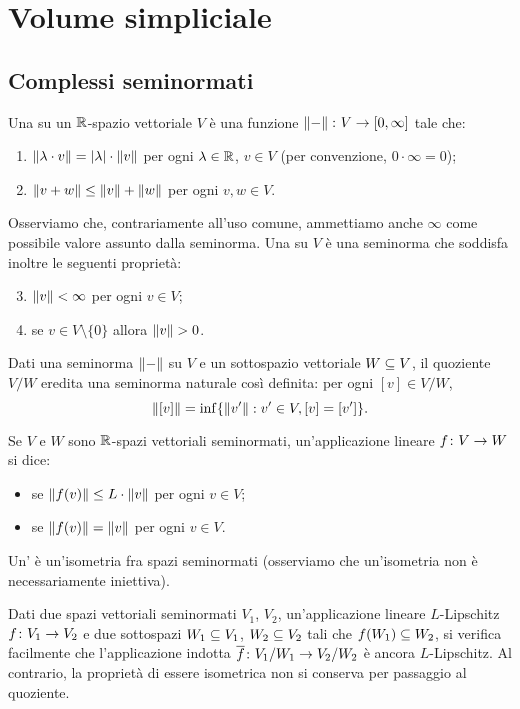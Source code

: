 \section{Volume simpliciale}

\subsection{Complessi seminormati}

\begin{definition}
Una  su un $\mathbb{R}$-spazio vettoriale $V$ è una funzione $\map{\norm{-}}{V}{[0,\infty]}$ tale che:
\begin{enumerate}
\item $\left\lVert \lambda\cdot v\right\rVert=|\lambda|\cdot\left\lVert v\right\rVert$ per ogni $\lambda\in\mathbb{R}$, $v\in V$ (per convenzione, $0\cdot\infty=0$);
\item $\left\lVert v+w\right\rVert\le\left\lVert v\right\rVert+\left\lVert w\right\rVert$ per ogni $v,w\in V$.
\end{enumerate}
\end{definition}
Osserviamo che, contrariamente all'uso comune, ammettiamo anche $\infty$ come possibile valore assunto dalla seminorma. Una  su $V$ è una seminorma che soddisfa inoltre le seguenti proprietà:
\begin{enumerate}
\setcounter{enumi}{2}
\item $\left\lVert v\right\rVert<\infty$ per ogni $v\in V$;
\item se $v\in V\setminus\{0\}$ allora $\left\lVert v\right\rVert>0$.
\end{enumerate}

Dati una seminorma $\left\lVert -\right\rVert$ su $V$ e un sottospazio vettoriale $W\subseteq V$, il quoziente $V/W$ eredita una seminorma naturale così definita: per ogni $[v]\in V/W$,
\[
\left\lVert [v]\right\rVert=\inf\{\left\lVert v'\right\rVert:v'\in V,[v]=[v']\}.
\]

Se $V$ e $W$ sono $\mathbb{R}$-spazi vettoriali seminormati, un'applicazione lineare $\map{f}{V}{W}$ si dice:
\begin{itemize}
\item {} se $\left\lVert f(v)\right\rVert\le L\cdot\left\lVert v\right\rVert$ per ogni $v\in V$;
\item {} se $\left\lVert f(v)\right\rVert=\left\lVert v\right\rVert$ per ogni $v\in V$.
\end{itemize}
Un' è un'isometria fra spazi seminormati (osserviamo che un'isometria non è necessariamente iniettiva).

Dati due spazi vettoriali seminormati $V_1$, $V_2$, un'applicazione lineare $L$-Lipschitz $\map{f}{V_1}{V_2}$ e due sottospazi $W_1\subseteq V_1$, $W_2\subseteq V_2$ tali che $f(W_1)\subseteq W_2$, si verifica facilmente che l'applicazione indotta $\map{\overline{f}}{V_1/W_1}{V_2/W_2}$ è ancora $L$-Lipschitz. Al contrario, la proprietà di essere isometrica non si conserva per passaggio al quoziente.

